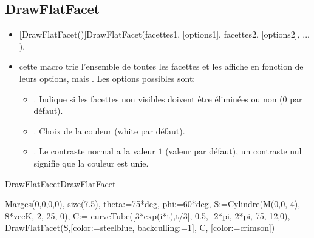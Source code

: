 \subsection{DrawFlatFacet}\label{macDrawFlatFacet}
\begin{itemize}
 \item \util \textbf[DrawFlatFacet()]{DrawFlatFacet(facettes1, [options1], facettes2, [options2], ... )}.
 \item \desc cette macro trie l'ensemble de toutes les facettes et les affiche en fonction de leurs options, mais . Les options possibles sont:

  \begin{itemize}
  \item {}. Indique si les facettes non visibles doivent être éliminées ou non (0 par défaut).
  \item {}. Choix de la couleur (white par défaut).
  \item {}. Le contraste normal a la valeur $1$ (valeur par défaut), un contraste nul signifie que la couleur est unie.
  \end{itemize}
\end{itemize}


\begin{demo}{DrawFlatFacet}{DrawFlatFacet}
\begin{texgraph}[name=DrawFlatFacet]
Marges(0,0,0,0), size(7.5),
theta:=75*deg, phi:=60*deg,
S:=Cylindre(M(0,0,-4), 8*vecK, 2, 25, 0),
C:= curveTube([3*exp(i*t),t/3],
    0.5, -2*pi, 2*pi, 75, 12,0),
DrawFlatFacet(S,[color:=steelblue,
         backculling:=1],
       C, [color:=crimson])
\end{texgraph}
\end{demo}


